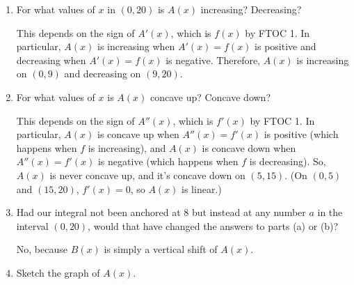 \documentclass[main]{subfiles}
\begin{document}
\begin{enumerate}[resume]
  \begin{enumerate}
  \item
    \begin{problem}[\vfill]
      For what values of $x$ in $(0, 20)$ is $A(x)$ increasing?
      Decreasing?
    \end{problem}

    \begin{solution}
      This depends on the sign of $A'(x)$, which is $f(x)$ by FTOC
      1.  In particular, $A(x)$ is increasing when $A'(x)
      = f(x)$ is positive and decreasing when $A'(x) = f(x)$ is
      negative.  Therefore, $A(x)$ is increasing on $(0, 9)$ and
      decreasing on $(9, 20)$.
    \end{solution}

  \item
    \begin{problem}[\vfill]
      For what values of $x$ is $A(x)$ concave up?  Concave down?
    \end{problem}

    \begin{solution}
      This depends on the sign of $A''(x)$, which is $f'(x)$ by
      FTOC 1.  In particular, $A(x)$ is concave up when $
      A''(x) = f'(x)$ is positive (which happens when $f$ is
      increasing), and $A(x)$ is concave down when $A''(x)
      = f'(x)$ is negative (which happens when $f$ is decreasing).  So,
      $A(x)$ is never concave up, and it's concave down on $(5,
      15)$.  (On $(0, 5)$ and $(15, 20)$, $f'(x) = 0$, so $A(x)$
      is linear.)
    \end{solution}

  \item
  \begin{problem}[\stretch{0.5}]
      Had our integral not been anchored at $8$ but instead at any
      number $a$ in the interval $(0,20)$, would that have changed
      the answers to parts (a) or (b)?
  \end{problem}

  \begin{solution}
      No, because $B(x)$ is simply a vertical shift of
      $A(x)$.
  \end{solution}

  \item
    \begin{problem}[\stretch{2.5}]
      Sketch the graph of $A(x)$. 
    \end{problem}


\end{enumerate}
\end{enumerate}
\end{document}
